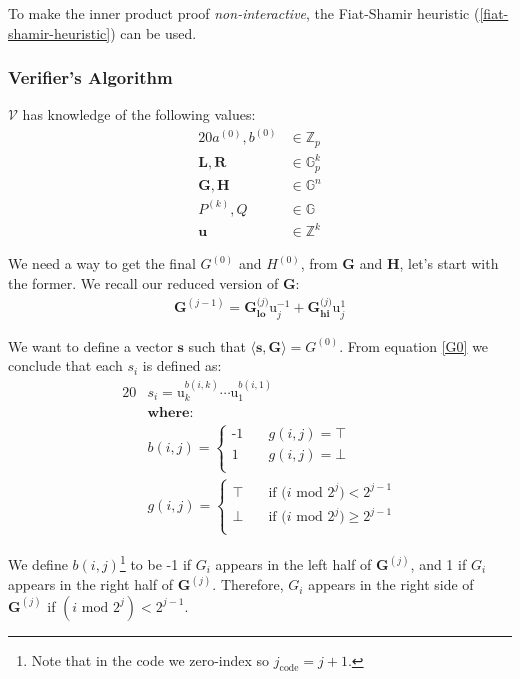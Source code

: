 \documentclass{article}
\newcommand{\eq}[1]{\begin{alignat*}{20}#1\end{alignat*}}
\newcommand{\eqn}[2]{\begin{equation}\label{#1}\begin{split}#2\end{split}\end{equation}}
\renewcommand{\vec}[1]{\boldsymbol{#1}}
\newcommand{\ran}[1]{\mathrm{#1}}
\newcommand{\vecran}[1]{\mathbf{#1}}
\newcommand{\V}{\mathcal{V}}
\newcommand{\G}{\mathbb{G}}
\newcommand{\Z}{\mathbb{Z}}
\newcommand{\dotp}[2]{\langle #1, #2 \rangle}
\newcommand{\opn}[1]{\operatorname{#1}}
\newcommand{\veclo}[1]{\vec{#1_{\opn{lo}}}}
\newcommand{\vechi}[1]{\vec{#1_{\opn{hi}}}}
\begin{document}
To make the inner product proof \textit{non-interactive}, the
Fiat-Shamir heuristic (\ref{fiat-shamir-heuristic}) can be used.

\subsubsection{Verifier's Algorithm}

$\V$ has knowledge of the following values:
\eq{
	a^{(0)}, b^{(0)} &\in \Z_p \\
	\vec{L}, \vec{R} &\in \G_p^{k} \\
	\vec{G}, \vec{H} &\in \G^n \\
	P^{(k)}, Q &\in \G \\
	\vecran{u} &\in \Z^{k}
}

We need a way to get the final $G^{(0)}$ and $H^{(0)}$, from $\vec{G}$
and $\vec{H}$, let's start with the former. We recall our reduced
version of $\vec{G}$:
\eqn{G0}{
	\vec{G}^{(j-1)} = \veclo{G^\textit{(j)}} \ran{u}^{-1}_j + \vechi{G^\textit{(j)}} \ran{u}^{1}_j
}

We want to define a vector $\vec{s}$ such that $\dotp{\vec{s}}{\vec{G}}
= G^{(0)}$. From equation \ref{G0} we conclude that each $s_i$ is
defined as:
\eq{
	&s_i = \ran{u}^{b(i,k)}_k \cdots \ran{u}^{b(i,1)}_1 \\
	&\textbf{where:} \\
	&b(i,j) = 
	\begin{cases}
		\text{-1} &\quad  g(i,j) = \top \\
		\text{1}  &\quad  g(i,j) = \bot \\
	\end{cases} \\
	&g(i,j) = 
	\begin{cases}
		\top &\quad  \text{if $(i$ mod $2^j) <    2^{j-1}$} \\
		\bot &\quad  \text{if $(i$ mod $2^j) \geq 2^{j-1}$} \\
	\end{cases}
}

We define $b(i,j)$\footnote{Note that in the code we zero-index
so $j_{\text{code}} = j+1$.} to be -1 if $G_i$ appears in the left
half of $\vec{G}^{(j)}$, and 1 if $G_i$ appears in the right half
of $\vec{G}^{(j)}$. Therefore, $G_i$ appears in the right side of
$\vec{G}^{(j)}$ if $(i \text{ mod } 2^j) < 2^{j-1}$.

\newpage
\end{document}
